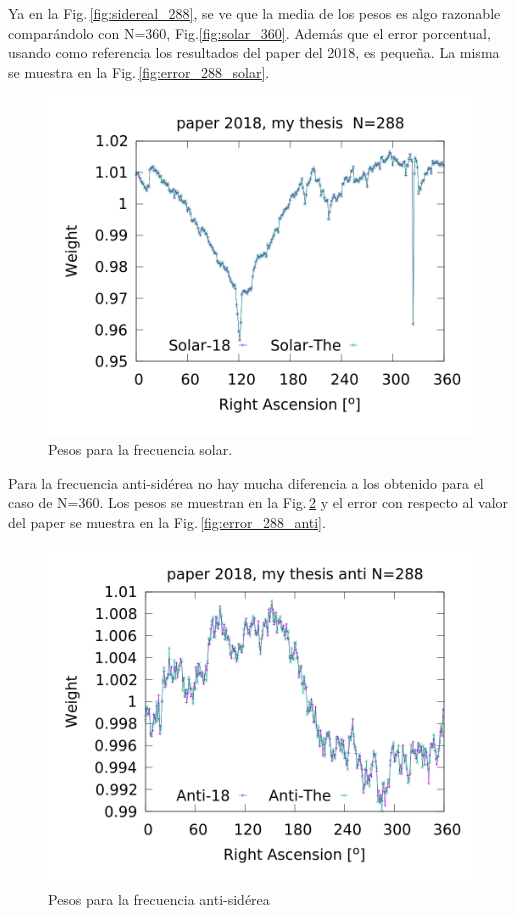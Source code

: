 	Ya en la Fig.\,\ref{fig:sidereal_288}, se ve que la media de los pesos es algo razonable comparándolo con N=360, Fig.\ref{fig:solar_360}. Además que el error porcentual, usando como referencia los resultados del paper del 2018, es pequeña. La misma se muestra en la Fig.\,\ref{fig:error_288_solar}.

	\begin{figure}[H]
	\centering
	\includegraphics[width=\linewidth]{Graficos/solar_my_and_paper_2018_in_288.png}
	\caption{Pesos para la frecuencia solar.}
	\label{fig:solar_288}
	\end{figure}


	Para la frecuencia anti-sidérea no hay mucha diferencia a los obtenido para el caso de N=360. Los pesos se muestran en la Fig.\,\ref{fig:anti_288} y el error con respecto al valor del paper se muestra en la Fig.\,\ref{fig:error_288_anti}.

	\begin{figure}[H]
	\centering
	\includegraphics[width=\linewidth]{Graficos/anti_my_and_paper_2018_in_288.png}
	\caption{Pesos para la frecuencia anti-sidérea}
	\label{fig:anti_288}
	\end{figure}
